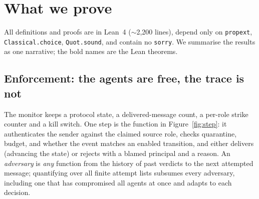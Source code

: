 \documentclass[10pt,twocolumn]{article}
\newcommand{\code}[1]{\texttt{\small #1}}
\begin{document}
\section{What we prove}

All definitions and proofs are in Lean~4 (\(\sim\)2{,}200 lines), depend only on
\code{propext}, \code{Classical.choice}, \code{Quot.sound}, and contain no \code{sorry}. We summarise the
results as one narrative; the bold names are the Lean theorems.

\subsection{Enforcement: the agents are free, the trace is not}

The monitor keeps a protocol state, a delivered-message count, a per-role strike counter and a kill
switch. One step is the function in Figure~\ref{fig:step}: it authenticates the sender against the claimed
source role, checks quarantine, budget, and whether the event matches an enabled transition, and either
delivers (advancing the state) or rejects with a blamed principal and a reason. An \emph{adversary} is
\emph{any} function from the history of past verdicts to the next attempted message; quantifying over all
finite attempt lists subsumes every adversary, including one that has compromised all agents at once and
adapts to each decision.
\end{document}

